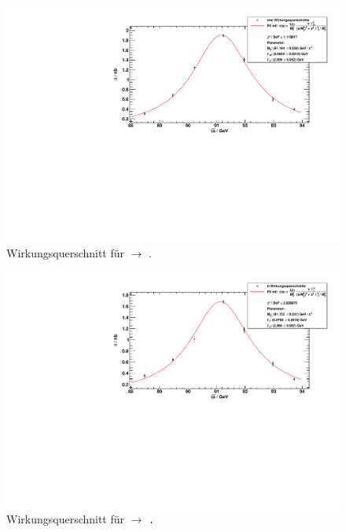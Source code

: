 \begin{figure}[H]
\begin{center}
  \includegraphics[width=\textwidth]{../img/crosssections_mm.pdf}
  \caption{Wirkungsquerschnitt für \ee $\to$ \mm.}
  \label{img:crosssection:mm}
\end{center}
\end{figure}

\begin{figure}[H]
\begin{center}
  \includegraphics[width=\textwidth]{../img/crosssections_tt.pdf}
  \caption{Wirkungsquerschnitt für \ee $\to$ \tt.}
  \label{img:crosssection:tt}
\end{center}
\end{figure}

